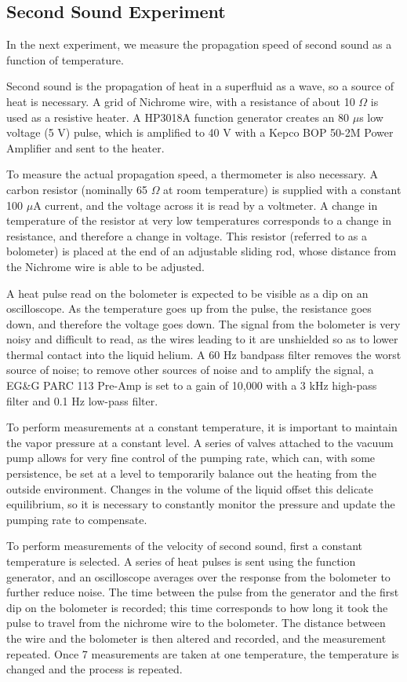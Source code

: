 \subsection{Second Sound Experiment}

In the next experiment, we measure the propagation speed of second sound as a function of temperature.

Second sound is the propagation of heat in a superfluid as a wave, so a source of heat is necessary. A grid of Nichrome wire, with a resistance of about 10 $\Omega$ is used as a resistive heater. A HP3018A function generator creates an 80 $\mu$s low voltage (5 V) pulse, which is amplified to 40 V with a Kepco BOP 50-2M Power Amplifier and sent to the heater. 

To measure the actual propagation speed, a thermometer is also necessary. A carbon resistor (nominally 65 $\Omega$ at room temperature) is supplied with a constant 100 $\mu$A current, and the voltage across it is read by a voltmeter. A change in temperature of the resistor at very low temperatures corresponds to a change in resistance, and therefore a change in voltage. This resistor (referred to as a bolometer) is placed at the end of an adjustable sliding rod, whose distance from the Nichrome wire is able to be adjusted.

A heat pulse read on the bolometer is expected to be visible as a dip on an oscilloscope. As the temperature goes up from the pulse, the resistance goes down, and therefore the voltage goes down. The signal from the bolometer is very noisy and difficult to read, as the wires leading to it are unshielded so as to lower thermal contact into the liquid helium. A 60 Hz bandpass filter removes the worst source of noise; to remove other sources of noise and to amplify the signal, a EG\&G PARC 113 Pre-Amp is set to a gain of 10,000 with a 3 kHz high-pass filter and 0.1 Hz low-pass filter.

To perform measurements at a constant temperature, it is important to maintain the vapor pressure at a constant level. A series of valves attached to the vacuum pump allows for very fine control of the pumping rate, which can, with some persistence, be set at a level to temporarily balance out the heating from the outside environment. Changes in the volume of the liquid offset this delicate equilibrium, so it is necessary to constantly monitor the pressure and update the pumping rate to compensate.

To perform measurements of the velocity of second sound, first a constant temperature is selected. A series of heat pulses is sent using the function generator, and an oscilloscope averages over the response from the bolometer to further reduce noise. The time between the pulse from the generator and the first dip on the bolometer is recorded; this time corresponds to how long it took the pulse to travel from the nichrome wire to the bolometer. The distance between the wire and the bolometer is then altered and recorded, and the measurement repeated. Once 7 measurements are taken at one temperature, the temperature is changed and the process is repeated.

